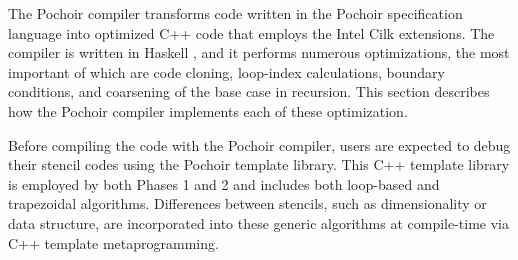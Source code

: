 


The Pochoir compiler transforms code written in the Pochoir
specification language into optimized C++ code that employs the Intel
Cilk extensions.  The compiler is written in Haskell \cite{PeytonJones98},
and it performs numerous optimizations, the most important of which
are code cloning, loop-index calculations, boundary conditions, and
coarsening of the base case in recursion.  This section describes how
the Pochoir compiler implements each of these optimization.

Before compiling the code with the Pochoir compiler, users are
expected to debug their stencil codes using the Pochoir template
library.  This C++ template library is employed by both Phases 1 and 2
and includes both loop-based and trapezoidal algorithms.  Differences
between stencils, such as dimensionality or data structure, are
incorporated into these generic algorithms at compile-time via {C++}
template metaprogramming.


